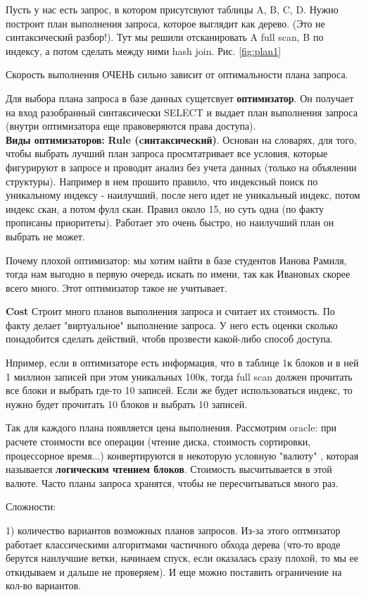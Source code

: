 Пусть у нас есть запрос, в котором присутсвуют таблицы A, B, C, D. Нужно построит план выполнения запроса, которое выглядит как дерево. (Это не синтаксический разбор!). Тут мы решили отсканировать A full scan, B по индексу, а потом сделать между ними hash join. Рис. \ref{fig:plan1}

Скорость выполнения ОЧЕНЬ сильно зависит от оптимальности плана запроса.


Для выбора плана запроса в базе данных сущетсвует \textbf{оптимизатор}. Он получает на вход разобранный синтаксически SELECT и выдает план выполнения запроса (внутри оптимизатора еще правоверяются права доступа). 
\\[60pt]
\textbf{Виды оптимизаторов:} 
\textbf{Rule (cинтаксический)}. Основан на словарях, для того, чтобы выбрать лучший план запроса просмтатривает все условия, которые фигурируют в запросе и проводит анализ без учета данных (только на объялении структуры). Например в нем прошито правило, что индексный поиск по уникальному индексу - наилучший, после него идет не уникальный индекс, потом индекс скан, а потом фулл скан. Правил около 15, но суть одна (по факту прописаны приоритеты). Работает это очень быстро, но наилучший план он выбрать не может.

Почему плохой оптимизатор: мы хотим найти в базе студентов Ианова Рамиля, тогда нам выгодно в первую очередь искать по имени, так как Ивановых скорее всего много. Этот оптимизатор такое не учитывает. 

\textbf{Cost} Строит много планов выполнения запроса и считает их стоимость. По факту делает "виртуальное" выполнение запроса. У него есть оценки сколько понадобится сделать действий, чтобв прозвести какой-либо способ доступа. 

Нпример, если в оптимизаторе есть информация, что в таблице 1к блоков и в ней 1 миллион записей при этом уникальных 100к, тогда full scan должен прочитать все блоки и выбрать где-то 10 записей. Если же будет использоваться индекс, то нужно будет прочитать 10 блоков и выбрать 10 записей. 

Так для каждого плана появляется цена выполнения. Рассмотрим oracle: при расчете стоимости все операции (чтение диска, стоимость сортировки, процессорное время...) конвертируются в некоторую условную "валюту" , которая называется \textbf{логическим чтением блоков}. Стоимость высчитывается в этой валюте. Часто планы запроса хранятся, чтобы не пересчитываться много раз. 

Сложности: 

1) количество вариантов возможных планов запросов. Из-за этого оптмизатор работает классическими алгоритмами частичного обхода дерева (что-то вроде берутся наилучшие ветки, начинаем спуск, если оказалась сразу плохой, то мы ее откидываем и дальше не проверяем). И еще можно поставить ограничение на кол-во вариантов. 


